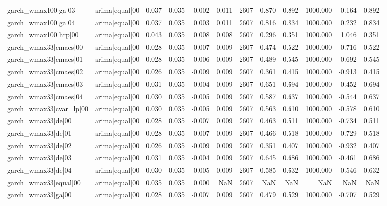 \begin{table}
\begin{tabular}{llrrrrrrrrrr}
garch\_wmax100|ga|03 & arima|equal|00 & 0.037 & 0.035 & 0.002 & 0.011 & 2607 & 0.870 & 0.892 & 1000.000 & 0.164 & 0.892 \\
garch\_wmax100|ga|04 & arima|equal|00 & 0.037 & 0.035 & 0.003 & 0.011 & 2607 & 0.816 & 0.834 & 1000.000 & 0.232 & 0.834 \\
garch\_wmax100|hrp|00 & arima|equal|00 & 0.043 & 0.035 & 0.008 & 0.008 & 2607 & 0.296 & 0.351 & 1000.000 & 1.046 & 0.351 \\
garch\_wmax33|cmaes|00 & arima|equal|00 & 0.028 & 0.035 & -0.007 & 0.009 & 2607 & 0.474 & 0.522 & 1000.000 & -0.716 & 0.522 \\
garch\_wmax33|cmaes|01 & arima|equal|00 & 0.028 & 0.035 & -0.006 & 0.009 & 2607 & 0.489 & 0.545 & 1000.000 & -0.692 & 0.545 \\
garch\_wmax33|cmaes|02 & arima|equal|00 & 0.026 & 0.035 & -0.009 & 0.009 & 2607 & 0.361 & 0.415 & 1000.000 & -0.913 & 0.415 \\
garch\_wmax33|cmaes|03 & arima|equal|00 & 0.031 & 0.035 & -0.004 & 0.009 & 2607 & 0.651 & 0.694 & 1000.000 & -0.452 & 0.694 \\
garch\_wmax33|cmaes|04 & arima|equal|00 & 0.030 & 0.035 & -0.005 & 0.009 & 2607 & 0.587 & 0.637 & 1000.000 & -0.544 & 0.637 \\
garch\_wmax33|cvar\_lp|00 & arima|equal|00 & 0.030 & 0.035 & -0.005 & 0.009 & 2607 & 0.563 & 0.610 & 1000.000 & -0.578 & 0.610 \\
garch\_wmax33|de|00 & arima|equal|00 & 0.028 & 0.035 & -0.007 & 0.009 & 2607 & 0.463 & 0.511 & 1000.000 & -0.734 & 0.511 \\
garch\_wmax33|de|01 & arima|equal|00 & 0.028 & 0.035 & -0.007 & 0.009 & 2607 & 0.466 & 0.518 & 1000.000 & -0.729 & 0.518 \\
garch\_wmax33|de|02 & arima|equal|00 & 0.026 & 0.035 & -0.009 & 0.009 & 2607 & 0.351 & 0.407 & 1000.000 & -0.932 & 0.407 \\
garch\_wmax33|de|03 & arima|equal|00 & 0.031 & 0.035 & -0.004 & 0.009 & 2607 & 0.645 & 0.686 & 1000.000 & -0.461 & 0.686 \\
garch\_wmax33|de|04 & arima|equal|00 & 0.030 & 0.035 & -0.005 & 0.009 & 2607 & 0.585 & 0.632 & 1000.000 & -0.546 & 0.632 \\
garch\_wmax33|equal|00 & arima|equal|00 & 0.035 & 0.035 & 0.000 & NaN & 2607 & NaN & NaN & NaN & NaN & NaN \\
garch\_wmax33|ga|00 & arima|equal|00 & 0.028 & 0.035 & -0.007 & 0.009 & 2607 & 0.479 & 0.529 & 1000.000 & -0.707 & 0.529 \\

\end{tabular}
\end{table}
